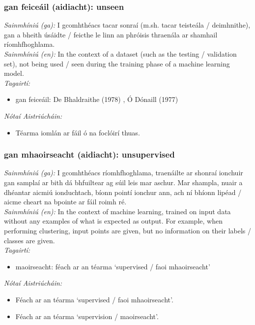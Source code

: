 \documentclass{article}
\begin{document}
\subsubsection*{gan feiceáil (aidiacht): unseen}
 \noindent \textit{Sainmhíniú (ga):} I gcomhthéacs tacar sonraí (m.sh. tacar teisteála / deimhnithe), gan a bheith úsáidte / feicthe le linn an phróisis thraenála ar shamhail ríomhfhoghlama.
\\
 \noindent \textit{Sainmhíniú (en):} In the context of a dataset (such as the testing / validation set), not being used / seen during the training phase of a machine learning model.
\\
 \noindent \textit{Tagairtí:}
\begin{itemize}
	\item gan feiceáil: De Bhaldraithe (1978) \cite{de-bhaldraithe}, Ó Dónaill (1977) \cite{odonaill}
\end{itemize}

 \noindent \textit{Nótaí Aistriúcháin:}
\begin{itemize}
	\item Téarma iomlán ar fáil ó na foclóirí thuas.
\end{itemize}


\subsubsection*{gan mhaoirseacht (aidiacht): unsupervised}
 \noindent \textit{Sainmhíniú (ga):} I gcomhthéacs ríomhfhoghlama, traenáilte ar shonraí ionchuir gan samplaí ar bith dá bhfuiltear ag súil leis mar aschur. Mar shampla, nuair a dhéantar aicmiú ionduchtach, bíonn pointí ionchur ann, ach ní bhíonn lipéad / aicme cheart na bpointe ar fáil roimh ré.
\\
 \noindent \textit{Sainmhíniú (en):} In the context of machine learning, trained on input data without any examples of what is expected as output. For example, when performing clustering, input points are given, but no information on their labels / classes are given.
\\
 \noindent \textit{Tagairtí:}
\begin{itemize}
	\item maoirseacht: féach ar an téarma `supervised / faoi mhaoirseacht'
\end{itemize}

 \noindent \textit{Nótaí Aistriúcháin:}
\begin{itemize}
	\item Féach ar an téarma `supervised / faoi mhaoirseacht'.
	\item Féach ar an téarma `supervision / maoirseacht'.
\end{itemize}
\end{document}
